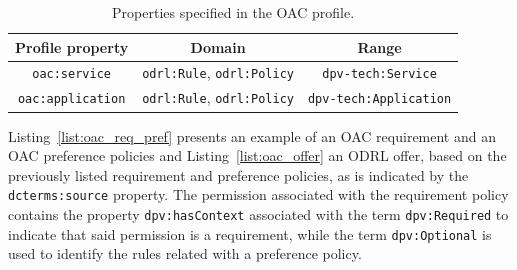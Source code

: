 \begin{table}[htbp]
\centering
\caption{Properties specified in the OAC profile.}
\label{tab:profile_properties}
\begin{tabular}{c||c|c}
Profile property & Domain & Range \\
\hline\hline
\texttt{oac:service} & \texttt{odrl:Rule}, \texttt{odrl:Policy} & \texttt{dpv-tech:Service} \\
\hline
\texttt{oac:application} & \texttt{odrl:Rule}, \texttt{odrl:Policy} & \texttt{dpv-tech:Application} \\
\end{tabular}
\end{table}

Listing~\ref{list:oac_req_pref} presents an example of an OAC requirement and an OAC preference policies and Listing~\ref{list:oac_offer} an ODRL offer, based on the previously listed requirement and preference policies, as is indicated by the \texttt{dcterms:source} property.
The permission associated with the requirement policy contains the property \texttt{dpv:hasContext} associated with the term \texttt{dpv:Required} to indicate that said permission is a requirement, while the term \texttt{dpv:Optional} is used to identify the rules related with a preference policy.

